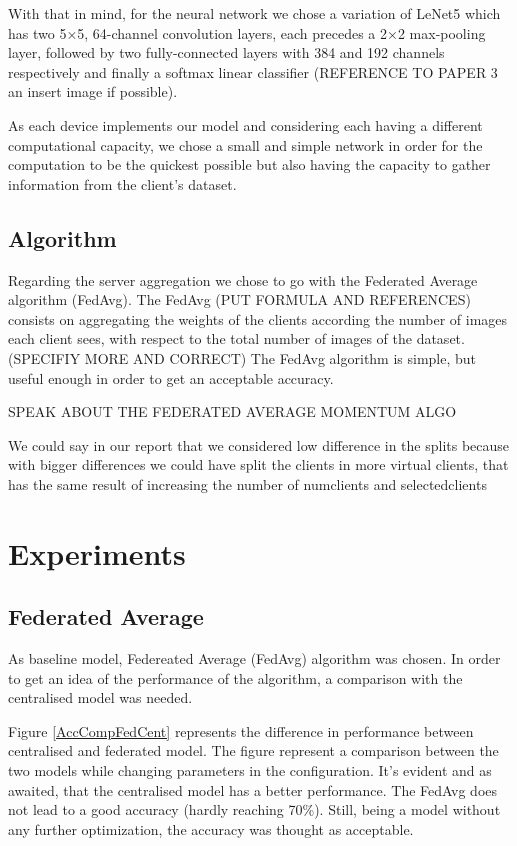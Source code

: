 \documentclass[twocolumn]{article}
\begin{document}
With that in mind, for the neural network we chose a variation of LeNet5 which has two 5×5, 64-channel convolution layers, each precedes a 2×2 max-pooling layer, followed by two fully-connected layers with 384 and 192 channels respectively and finally a softmax linear classifier (REFERENCE TO PAPER 3 an insert image if possible). 

As each device implements our model and considering each having a different computational capacity, we chose a small and simple network in order for the computation to be the quickest possible but also having the capacity to gather information from the client's dataset.

\subsection{Algorithm}
Regarding the server aggregation we chose to go with the Federated Average algorithm (FedAvg). The FedAvg (PUT FORMULA AND REFERENCES) consists on aggregating the weights of the clients according the number of images each client sees, with respect to the total number of images of the dataset.(SPECIFIY MORE AND CORRECT)
The FedAvg algorithm is simple, but useful enough in order to get an acceptable accuracy.

SPEAK ABOUT THE FEDERATED AVERAGE MOMENTUM ALGO

We could say in our report that we considered low difference in the splits because with bigger differences we could have split  the clients in more virtual clients, that has the same result of increasing the number of numclients and selectedclients

\section{Experiments} %
\subsection{Federated Average}
As baseline model, Federeated Average (FedAvg) algorithm was chosen. In order to get an idea of the performance of the algorithm, a comparison with the centralised model was needed. 

Figure \ref{AccCompFedCent} represents the difference in performance between centralised and federated model. The figure represent a comparison between the two models while changing parameters in the configuration. It's evident and as awaited, that the centralised model has a better performance. The FedAvg does not lead to a good accuracy (hardly reaching 70\%). Still, being a model without any further optimization, the accuracy was thought as acceptable.
\end{document}
